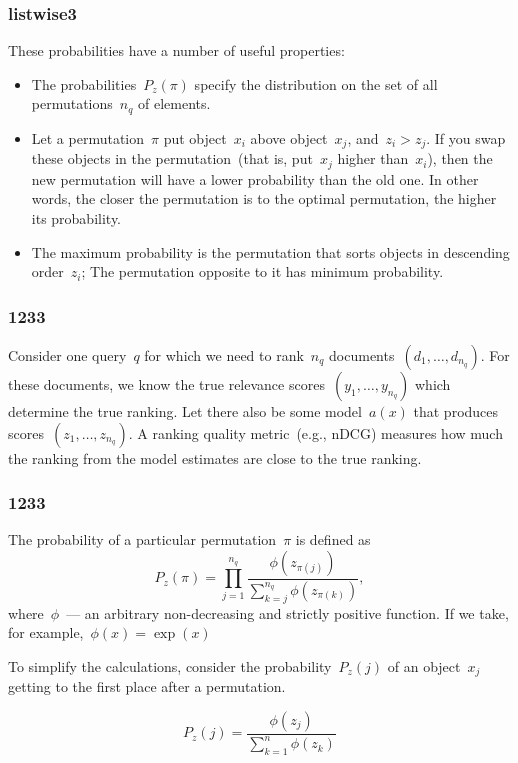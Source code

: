 \documentclass{beamer}
\begin{document}
\begin{frame}
    \frametitle{listwise3}
These probabilities have a number of useful properties:
\begin{itemize}
    \item The probabilities~$P_z(\pi)$ specify the distribution on the set of all permutations~$n_q$ of elements.
    \item Let a permutation~$\pi$ put object~$x_i$ above object~$x_j$,
        and~$z_i > z_j$.
        If you swap these objects in the permutation~(that is, put~$x_j$ higher than~$x_i$),
        then the new permutation will have a lower probability than the old one.
        In other words, the closer the permutation is to the optimal permutation, the higher its probability.
    \item The maximum probability is the permutation that sorts objects in descending order~$z_i$;
        The permutation opposite to it has minimum probability.
\end{itemize}
\end{frame}



\begin{frame}
    \frametitle{1233}
    Consider one query~$q$ for which we need to rank~$n_q$ documents~$(d_1, \dots, d_{n_q})$.
    For these documents, we know the true relevance scores~$(y_1, \dots, y_{n_q})$
    which determine the true ranking.
    Let there also be some model~$a(x)$ that produces scores~$(z_1, \dots, z_{n_q})$.
    A ranking quality metric~(e.g., nDCG) measures how much the ranking from the model estimates
    are close to the true ranking.
\end{frame}

\begin{frame}
\frametitle{1233}
The probability of a particular permutation~$\pi$ is defined as
\[
    P_z(\pi)
    =
    \prod_{j = 1}^{n_q}
        \frac{
            \phi(z_{\pi(j)})
        }{
            \sum_{k = j}^{n_q}
                \phi(z_{\pi(k)})
        },
\]
where~$\phi$~--- an arbitrary non-decreasing and strictly positive function. If we take, for example,~$\phi(x) = \exp(x)$


To simplify the calculations, consider the probability~$P_z(j)$ of an object~$x_j$ getting to the first place
after a permutation.

\[
    P_z(j)
    =
    \frac{
        \phi(z_j)
    }{
        \sum_{k = 1}^{n}
            \phi(z_k)
    }
\]
\end{frame}
\end{document}
